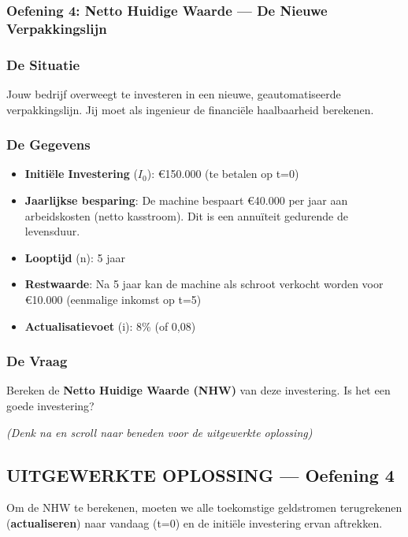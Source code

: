 \documentclass[a4paper,11pt]{article}
\begin{document}
\begin{oefenblok}
    \subsubsection*{Oefening 4: Netto Huidige Waarde — De Nieuwe Verpakkingslijn}

\subsubsection*{De Situatie}
Jouw bedrijf overweegt te investeren in een nieuwe, geautomatiseerde verpakkingslijn. Jij moet als ingenieur de financiële haalbaarheid berekenen.

\subsubsection*{De Gegevens}

\begin{itemize}
    \item \textbf{Initiële Investering} ($I_0$): €150.000 (te betalen op t=0)
    \item \textbf{Jaarlijkse besparing}: De machine bespaart €40.000 per jaar aan arbeidskosten (netto kasstroom). Dit is een annuïteit gedurende de levensduur.
    \item \textbf{Looptijd} (n): 5 jaar
    \item \textbf{Restwaarde}: Na 5 jaar kan de machine als schroot verkocht worden voor €10.000 (eenmalige inkomst op t=5)
    \item \textbf{Actualisatievoet} (i): 8\% (of 0,08)
\end{itemize}

\subsubsection*{De Vraag}
Bereken de \textbf{Netto Huidige Waarde (NHW)} van deze investering. Is het een goede investering?

\vspace{0.3cm}
\textit{(Denk na en scroll naar beneden voor de uitgewerkte oplossing)}

\subsection*{UITGEWERKTE OPLOSSING — Oefening 4}

Om de NHW te berekenen, moeten we alle toekomstige geldstromen terugrekenen (\textbf{actualiseren}) naar vandaag (t=0) en de initiële investering ervan aftrekken.


\end{oefenblok}
\end{document}
